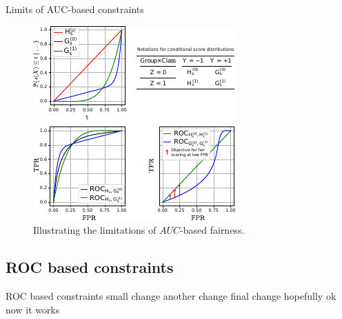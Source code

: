 \begin{frame}{Limits of AUC-based constraints}
    \begin{figure}[t]
        \centering
        \includegraphics[width=0.6\columnwidth]{images/original_paper/example_simple_dists_explained_with_table2.pdf}
        \caption{Illustrating the limitations of $AUC$-based fairness.}
        \label{fig:example-1}
    \end{figure}
\end{frame}

\subsection{ROC based constraints}
\begin{frame}{ROC based constraints}
    small change another change final change hopefully ok now it works
\end{frame}
